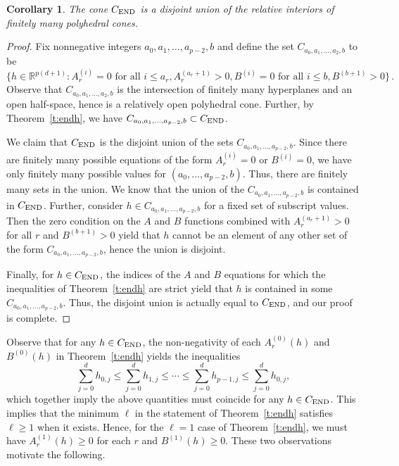 \documentclass[12pt]{amsart}
\newtheorem{cor}[thm]{Corollary}
\theoremstyle{definition}
\numberwithin{equation}{section}
\renewcommand\>{\rangle}
\newcommand\<{\langle}
\newcommand\0{\mathbf{0}}
\newcommand\RR{\mathbb{R}}
\newcommand{\CEND}{C_\textnormal{END}}
\begin{document}
\begin{cor}\label{cor:disjointend}
The cone $\CEND$ is a disjoint union of the relative interiors of finitely many polyhedral cones.  
\end{cor}

\begin{proof}
Fix nonnegative integers $a_0, a_1, \dots, a_{p-2}, b$ and define the set $C_{a_0,a_1,\dots,a_2, b}$ to be
\[
\{h \in \RR^{p(d+1)} : A_r^{(i)} = 0 \text{ for all } i \leq a_r, A_r^{(a_r+1)} > 0, B^{(i)} = 0 \text{ for all } i \leq b, B^{(b+1)} > 0\} \, .
\]
Observe that $C_{a_0,a_1,\dots,a_2, b}$ is the intersection of finitely many hyperplanes and an open half-space, hence is a relatively open polyhedral cone.
Further, by Theorem~\ref{t:endh}, we have $C_{a_0,a_1,\dots,a_{p-2},b} \subset \CEND$.

We claim that $\CEND$ is the disjoint union of the sets $C_{a_0,a_1,\dots,a_{p-2},b}$.
Since there are finitely many possible equations of the form $A_r^{(i)} = 0$ or $B^{(i)}=0$, we have only finitely many possible values for $(a_0,\dots,a_{p-2},b)$.
Thus, there are finitely many sets in the union.
We know that the union of the $C_{a_0,a_1,\dots,a_{p-2},b}$ is contained in $\CEND$.
Further, consider $h \in C_{a_0,a_1,\dots,a_{p-2},b}$ for a fixed set of subscript values. 
Then the zero condition on the $A$ and $B$ functions combined with $A_{r}^{(a_r + 1)} > 0$ for all $r$ and $B^{(b+1)} > 0$ yield that $h$ cannot be an element of any other set of the form $C_{a_0,a_1,\dots,a_{p-2},b}$, hence the union is disjoint.

Finally, for $h\in \CEND$, the indices of the $A$ and $B$ equations for which the inequalities of Theorem~\ref{t:endh} are strict yield that $h$ is contained in some $C_{a_0,a_1,\dots,a_{p-2},b}$.
Thus, the disjoint union is actually equal to $\CEND$, and our proof is complete.
\end{proof}

Observe that for any $h\in C_{\textnormal{END}}$, the non-negativity of each $A_r^{(0)}(h)$ and $B^{(0)}(h)$ in Theorem~\ref{t:endh} yields the inequalities
$$
\sum_{j=0}^d h_{0,j}
\le \sum_{j=0}^d h_{1,j}
\le \cdots
\le \sum_{j=0}^d h_{p-1,j}
\le \sum_{j=0}^d h_{0,j},
$$
which together imply the above quantities must coincide for any $h\in C_\textnormal{END}$.  
This implies that the minimum $\ell$ in the statement of Theorem~\ref{t:endh} satisfies $\ell \ge 1$ when it exists.  
Hence, for the $\ell = 1$ case of Theorem~\ref{t:endh}, we must have $A_r^{(1)}(h) \ge 0$ for each $r$ and $B^{(1)}(h) \ge 0$.
These two observations motivate the following.
\end{document}
